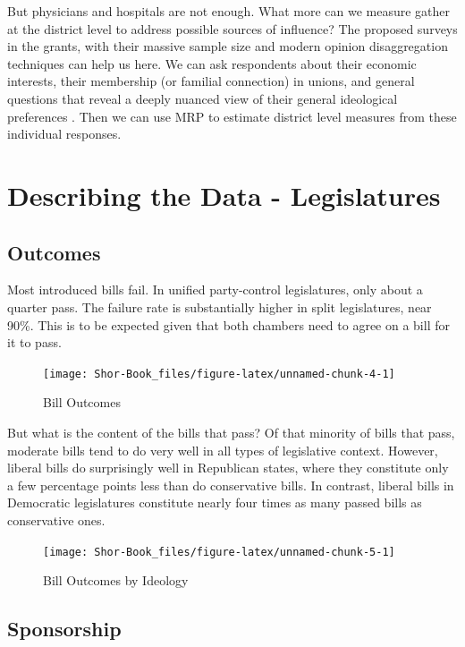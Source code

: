 \documentclass[
  oneside]{book}
\begin{document}
But physicians and hospitals are not enough. What more can we measure gather at the district level to address possible sources of influence? The proposed surveys in the grants, with their massive sample size and modern opinion disaggregation techniques can help us here. We can ask respondents about their economic interests, their membership (or familial connection) in unions, and general questions that reveal a deeply nuanced view of their general ideological preferences \citep{Jessee:2012, ShorRogowski:2018}. Then we can use MRP to estimate district level measures from these individual responses.

\hypertarget{describing-the-data---legislatures}{%
\chapter{Describing the Data - Legislatures}\label{describing-the-data---legislatures}}

\hypertarget{outcomes}{%
\section{Outcomes}\label{outcomes}}

Most introduced bills fail. In unified party-control legislatures, only about a quarter pass. The failure rate is substantially higher in split legislatures, near 90\%. This is to be expected given that both chambers need to agree on a bill for it to pass.

\begin{figure}
\texttt{[image: Shor-Book\_files/figure-latex/unnamed-chunk-4-1]} \caption{Bill Outcomes}\label{fig:unnamed-chunk-4}
\end{figure}

But what is the content of the bills that pass? Of that minority of bills that pass, moderate bills tend to do very well in all types of legislative context. However, liberal bills do surprisingly well in Republican states, where they constitute only a few percentage points less than do conservative bills. In contrast, liberal bills in Democratic legislatures constitute nearly four times as many passed bills as conservative ones.

\begin{figure}
\texttt{[image: Shor-Book\_files/figure-latex/unnamed-chunk-5-1]} \caption{Bill Outcomes by Ideology}\label{fig:unnamed-chunk-5}
\end{figure}

\hypertarget{sponsorship}{%
\section{Sponsorship}\label{sponsorship}}
\end{document}
